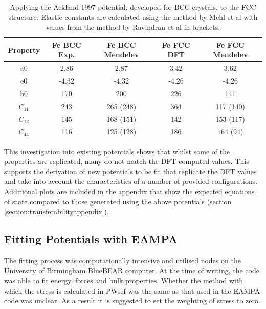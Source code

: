 \begin{table}[h]
\begin{center}
\begin{tabular}{c c c c c}
\hline\hline
Property   & Fe BCC Exp. & Fe BCC Mendelev &  Fe FCC DFT & Fe FCC Mendelev \\
\hline\hline
a0             &   2.86  &   2.87       &   3.42   &   3.62          \\
e0             &  -4.32  &  -4.32       &  -4.26   &  -4.26          \\
b0             &   170   &   200        &   226    &   141           \\
$C_{11}$       &   243   &   265 (248)  &   364    &   117 (140)     \\
$C_{12}$       &   145   &   168 (151)  &   142    &   153 (117)     \\
$C_{44}$       &   116   &   125 (128)  &   186    &   164 (94)      \\
\hline\hline
\end{tabular}
\end{center}
\caption{Applying the Ackland 1997 potential, developed for BCC crystals, to the FCC structure.  Elastic constants are calculated using the method by Mehl et al with values from the method by Ravindran et al in brackets.}
\label{table:feacklandtransferability}
\end{table}

This investigation into existing potentials shows that whilst some of the properties are replicated, many do not match the DFT computed values.  This supports the derivation of new potentials to be fit that replicate the DFT values and take into account the characteristics of a number of provided configurations.  Additional plots are included in the appendix that show the expected equations of state compared to those generated using the above potentials (section \ref{section:transferabilityappendix}).







\subsection{Fitting Potentials with EAMPA}

The fitting process was computationally intensive and utilised nodes on the University of Birmingham BlueBEAR computer.  At the time of writing, the code was able to fit energy, forces and bulk properties.  Whether the method with which the stress is calculated in PWscf was the same as that used in the EAMPA code was unclear.  As a result it is suggested to set the weighting of stress to zero.

